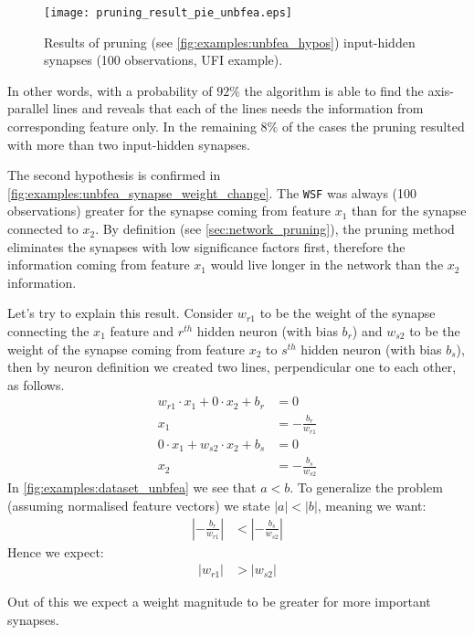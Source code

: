 \begin{figure}[H]
\centering
\texttt{[image: pruning\_result\_pie\_unbfea.eps]}
\caption{Results of pruning (see \cref{fig:examples:unbfea_hypos}) input-hidden synapses (100 observations, UFI example).}
\label{fig:examples:pruning_result_pie_unbfea}
\end{figure}

In other words, with a probability of $ 92\% $ the algorithm is able to find the axis-parallel lines and reveals that each of the lines needs the information from corresponding feature only. In the remaining $ 8\% $ of the cases the pruning resulted with more than two input-hidden synapses.

The second hypothesis is confirmed in \cref{fig:examples:unbfea_synapse_weight_change}. The \texttt{WSF} was always (100 observations) greater for the synapse coming from feature $ x_1 $ than for the synapse connected to $ x_2 $. By definition (see \cref{sec:network_pruning}), the pruning method eliminates the synapses with low significance factors first, therefore the information coming from feature $ x_1 $ would live longer in the network than the $ x_2 $ information.

Let's try to explain this result. Consider $ w_{r1} $ to be the weight of the synapse connecting the $ x_1 $ feature and $ r^{th} $ hidden neuron (with bias $ b_r$) and $ w_{s2} $ to be the weight of the synapse coming from feature $ x_2 $ to $ s^{th} $ hidden neuron (with bias $ b_s $), then by neuron definition \citep{rosenblatt:perceptron} we created two lines, perpendicular one to each other, as follows.
\begin{align}
w_{r1} \cdot x_1 + 0 \cdot x_2 + b_r &= 0 \\
x_1 &= -\frac{b_r}{w_{r1}} \\
0 \cdot x_1 + w_{s2} \cdot x_2 + b_s &= 0 \\
x_2 &= -\frac{b_s}{w_{s2}}
\end{align}
In \cref{fig:examples:dataset_unbfea} we see that $ a < b $. To generalize the problem (assuming normalised feature vectors) we state $ |a| < |b| $, meaning we want:
\begin{align}
|-\frac{b_r}{w_{r1}}| &< |-\frac{b_s}{w_{s2}}|
\end{align}
Hence we expect:
\begin{align}
|w_{r1}| &> |w_{s2}|
\end{align}

Out of this we expect a weight magnitude to be greater for more important synapses.

